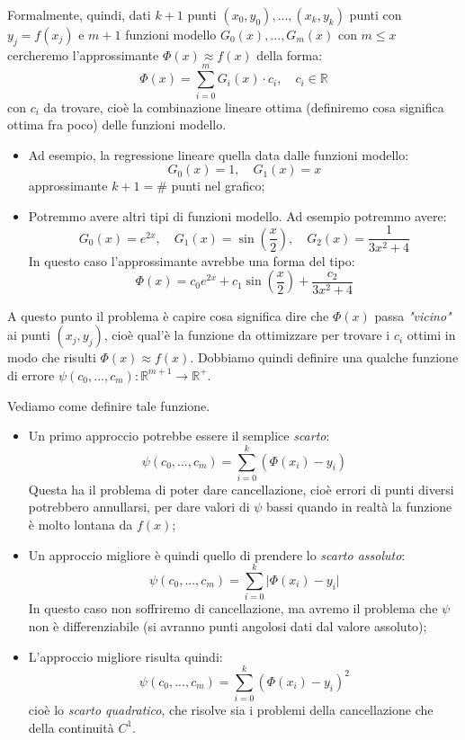 \documentclass[a4paper,11pt]{article}
\begin{document}
Formalmente, quindi, dati $k + 1$ punti $(x_0, y_0), ..., (x_k, y_k)$ punti con $y_j = f(x_j)$ e $m + 1$ funzioni modello $G_0(x), ..., G_m(x)$ con $m \leq x$ cercheremo l'approssimante $\Phi(x) \approx f(x)$ della forma:
$$
\Phi(x) = \sum_{i = 0}^m G_i(x) \cdot c_i, \quad c_i \in \mathbb{R}
$$
con $c_i$ da trovare, cioè la combinazione lineare ottima (definiremo cosa significa ottima fra poco) delle funzioni modello.

\begin{itemize}
	\item 
		Ad esempio, la regressione lineare quella data dalle funzioni modello:
		$$
		G_0(x) = 1, \quad G_1(x) = x
		$$
		approssimante $k + 1 = \#$ punti nel grafico;
	\item Potremmo avere altri tipi di funzioni modello.
		Ad esempio potremmo avere:
		$$
		G_0(x) = e^{2x}, \quad G_1(x) = \sin\left( \frac{x}{2} \right), \quad G_2(x) = \frac{1}{3x^2 + 4}
		$$
		In questo caso l'approssimante avrebbe una forma del tipo:
		$$
		\Phi(x) = c_0 e^{2x} + c_1 \sin \left( \frac{x}{2} \right) + \frac{c_2}{3x^2 + 4}
		$$
\end{itemize}

\par\smallskip

A questo punto il problema è capire cosa significa dire che $\Phi(x)$ passa \textit{"vicino"} ai punti $(x_j, y_j)$, cioè qual'è la funzione da ottimizzare per trovare i $c_i$ ottimi in modo che risulti $\Phi(x) \approx f(x)$.
Dobbiamo quindi definire una qualche funzione di errore $\psi(c_0, ..., c_m) : \mathbb{R}^{m + 1} \rightarrow \mathbb{R}^+$.

Vediamo come definire tale funzione.
\begin{itemize}
	\item Un primo approccio potrebbe essere il semplice \textit{scarto}:
		$$
		\psi(c_0, ..., c_m) = \sum_{i = 0}^k \left( \Phi(x_i) - y_i \right)
		$$
		Questa ha il problema di poter dare cancellazione, cioè errori di punti diversi potrebbero annullarsi, per dare valori di $\psi$ bassi quando in realtà la funzione è molto lontana da $f(x)$;
	\item Un approccio migliore è quindi quello di prendere lo \textit{scarto assoluto}:
		$$
		\psi(c_0, ..., c_m) = \sum_{i = 0}^k \Big| \Phi(x_i) - y_i \Big|
		$$
		In questo caso non soffriremo di cancellazione, ma avremo il problema che $\psi$ non è differenziabile (si avranno punti angolosi dati dal valore assoluto);
	\item L'approccio migliore risulta quindi:
		$$
		\psi(c_0, ..., c_m) = \sum_{i = 0}^k \left( \Phi(x_i) - y_i \right)^2
		$$
		cioè lo \textit{scarto quadratico}, che risolve sia i problemi della cancellazione che della continuità $C^1$.
\end{itemize}
\end{document}
